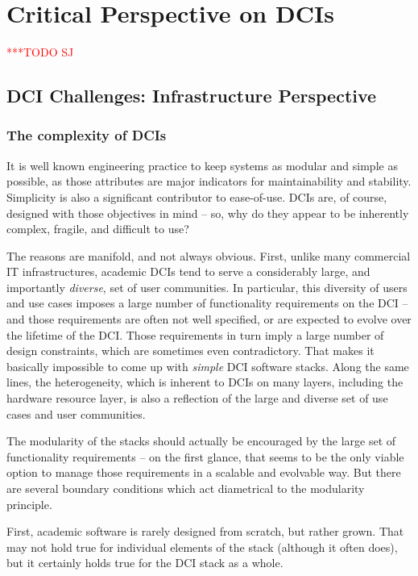 \documentclass[a4paper,10pt]{article}
\newcommand{\todo}[1]{     {\textcolor{red}  { ***TODO      #1 }}}
\newcommand{\todo}[1]{}
\newcommand{\I}[1]{\textit{#1}\xspace}
\begin{document}
\section{Critical Perspective on DCIs}\todo{SJ}


\subsection{DCI Challenges: Infrastructure Perspective}

 \subsubsection{The complexity of DCIs}

  It is well known engineering practice to keep systems as modular and
  simple as possible, as those attributes are major indicators for
  maintainability and stability.  Simplicity is also a significant
  contributor to ease-of-use.  DCIs are, of course, designed with
  those objectives in mind -- so, why do they appear to be inherently
  complex, fragile, and difficult to use?

  The reasons are manifold, and not always obvious.  First, unlike
  many commercial IT infrastructures, academic DCIs tend to serve a
  considerably large, and importantly \I{diverse}, set of user
  communities.  In particular, this diversity of users and use cases
  imposes a large number of functionality requirements on the DCI --
  and those requirements are often not well specified, or are expected
  to evolve over the lifetime of the DCI.  Those requirements in turn
  imply a large number of design constraints, which are sometimes even
  contradictory.  That makes it basically impossible to come up with
  \I{simple} DCI software stacks.  Along the same lines, the
  heterogeneity, which is inherent to DCIs on many layers, including
  the hardware resource layer, is also a reflection of the large and
  diverse set of use cases and user communities.

  The modularity of the stacks should actually be encouraged by the
  large set of functionality requirements -- on the first glance, that
  seems to be the only viable option to manage those requirements in a
  scalable and evolvable way.  But there are several boundary
  conditions which act diametrical to the modularity principle.

  First, academic software is rarely designed from scratch, but rather
  grown.  That may not hold true for individual elements of the stack
  (although it often does), but it certainly holds true for the DCI
  stack as a whole.
\end{document}
